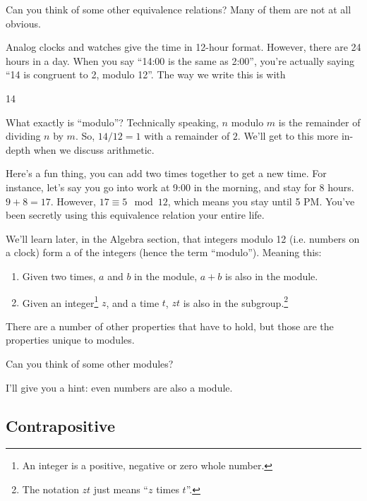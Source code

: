 Can you think of some other equivalence relations? Many of them are
not at all obvious.

\begin{example}
  Analog clocks and watches give the time in 12-hour format. However,
  there are 24 hours in a day. When you say ``14:00 is the same as
  2:00'', you're actually saying ``14 is congruent to 2, modulo
  12''. The way we write this is with

  \begin{zz}
    14  
  \end{zz}

  What exactly is ``modulo''? Technically speaking, $n$ modulo $m$ is
  the remainder of dividing $n$ by $m$. So, $14 / 12 = 1$ with a
  remainder of $2$. We'll get to this more in-depth when we discuss
  arithmetic.

  Here's a fun thing, you can add two times together to get a new
  time. For instance, let's say you go into work at 9:00 in the
  morning, and stay for 8 hours. $9 + 8 = 17$. However,
  $17 \equiv 5 \mod 12$, which means you stay until 5 PM. You've been
  secretly using this equivalence relation your entire life.

  We'll learn later, in the Algebra section, that integers modulo 12
  (i.e. numbers on a clock) form a  of the integers
  (hence the term ``modulo''). Meaning this:

  \begin{enumerate}
  \item Given two times, $a$ and $b$ in the module, $a + b$ is also in
    the module.
  \item Given an integer\footnote{An integer is a positive, negative
      or zero whole number.} $z$, and a time $t$, $zt$ is also in the
    subgroup.\footnote{The notation $zt$ just means ``$z$ times
      $t$''.}
  \end{enumerate}

  There are a number of other properties that have to hold, but those
  are the properties unique to modules.

  Can you think of some other modules?

  I'll give you a hint: even numbers are also a module.
\end{example}

\subsection{Contrapositive}

